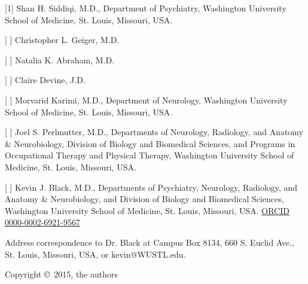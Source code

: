 [1] Shan H. Siddiqi, M.D., Department of Psychiatry, Washington University School of Medicine, St. Louis, Missouri, USA.

[ ] Christopher L. Geiger, M.D.

[ ] Natalia K. Abraham, M.D.

[ ] Claire Devine, J.D.

[ ] Morvarid Karimi, M.D., Department of Neurology, Washington University School of Medicine, St. Louis, Missouri, USA.

[ ] Joel S. Perlmutter, M.D., Departments of Neurology, Radiology, and Anatomy & Neurobiology, Division of Biology and Biomedical Sciences, and Programs in Occupational Therapy and Physical Therapy, Washington University School of Medicine, St. Louis, Missouri, USA.

[ ] Kevin J. Black, M.D., Departments of Psychiatry, Neurology, Radiology, and Anatomy \& Neurobiology, and Division of Biology and Biomedical Sciences, Washington University School of Medicine, St. Louis, Missouri, USA.  \href{http://orcid.org/0000-0002-6921-9567}{ORCID 0000-0002-6921-9567}

Address correspondence to Dr. Black at Campus Box 8134, 660 S. Euclid Ave., St. Louis, Missouri, USA, or kevin@WUSTL.edu.

Copyright \copyright\, 2015, the authors